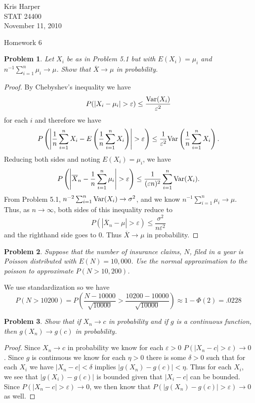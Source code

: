 \documentclass{article}
\newtheorem{problem}{Problem}
\newcommand{\var}{\textup{Var}}
\begin{document}
\begin{flushright}
Kris Harper\\

STAT 24400\\

November 11, 2010
\end{flushright}

\begin{center}
Homework 6
\end{center}

\begin{problem}
Let $X_i$ be as in Problem 5.1 but with $E(X_i) = \mu_i$ and $n^{-1} \sum_{i=1}^n \mu_i \rightarrow \mu$. Show that $\overline{X} \rightarrow \mu$ in probability.
\end{problem}
\begin{proof}
By Chebyshev's inequality we have
\[
P(|X_i - \mu_i| > \varepsilon) \leq \frac{\var(X_i)}{\varepsilon^2}
\]
for each $i$ and therefore we have
\[
P \left ( \left | \frac{1}{n} \sum_{i=1}^n X_i - E \left ( \frac{1}{n} \sum_{i=1}^n X_i \right ) \right | > \varepsilon \right ) \leq \frac{1}{\varepsilon^2} \var \left ( \frac{1}{n} \sum_{i=1}^n X_i \right ).
\]
Reducing both sides and noting $E(X_i) = \mu_i$, we have
\[
P \left ( \left | \overline{X}_n - \frac{1}{n} \sum_{i=1}^n \mu_i \right | > \varepsilon \right ) \leq \frac{1}{(\varepsilon n)^2} \sum_{i=1}^n \var(X_i).
\]
From Problem 5.1, $n^{-2} \sum_{i=1}^n \var(X_i) \rightarrow \sigma^2$, and we know $n^{-1} \sum_{i=1}^n \mu_i \rightarrow \mu$. Thus, as $n \rightarrow \infty$, both sides of this inequality reduce to
\[
P(|\overline{X}_n - \mu| > \varepsilon) \leq \frac{\sigma^2}{n\varepsilon^2}
\]
and the righthand side goes to $0$. Thus $\overline{X} \rightarrow \mu$ in probability.
\end{proof}

\begin{problem}
Suppose that the number of insurance claims, $N$, filed in a year is Poisson distributed with $E(N) = 10,000$. Use the normal approximation to the poisson to approximate $P(N > 10,200)$.
\end{problem}

We use standardization so we have
\[
P(N > 10200) = P \left ( \frac{N - 10000}{\sqrt{10000}} > \frac{10200 - 10000}{\sqrt{10000}} \right ) \approx 1 - \Phi (2) = .0228
\]

\begin{problem}
Show that if $X_n \rightarrow c$ in probability and if $g$ is a continuous function, then $g(X_n) \rightarrow g(c)$ in probability.
\end{problem}
\begin{proof}
Since $X_n \rightarrow c$ in probability we know for each $\varepsilon > 0$ $P(|X_n - c| > \varepsilon) \rightarrow 0$. Since $g$ is continuous we know for each $\eta > 0$ there is some $\delta > 0$ such that for each $X_i$ we have $|X_n - c| < \delta$ implies $|g(X_n) - g(c)| < \eta$. Thus for each $X_i$, we see that $|g(X_i) - g(c)|$ is bounded given that $|X_i - c|$ can be bounded. Since $P(|X_n - c| > \varepsilon) \rightarrow 0$, we then know that $P(|g(X_n) - g(c)| > \varepsilon) \rightarrow 0$ as well.
\end{proof}
\end{document}
